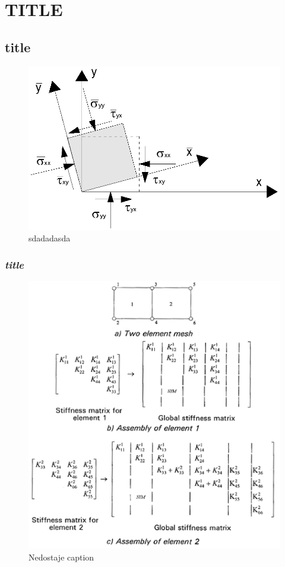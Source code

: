 \chapter{\uppercase{title}}
\lipsum[1-3]


\section{title}

\lipsum[1-3]


\begin{figure}
	\centering
	\includegraphics[width=0.7\linewidth]{Slike/2dtrans}
	\caption{sdadadasda}
	\label{fig:2dtrans}
\end{figure}


\subsection{\textit{title}}


\lipsum[1-3]

\begin{figure}
	\centering
	\includegraphics[width=0.7\linewidth]{Slike/assembly}
	\caption{Nedostaje caption}
	\label{fig:assembly}
\end{figure}


